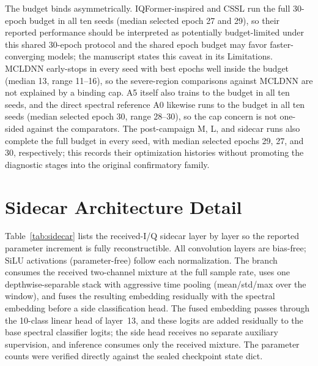 \documentclass[letterpaper,onecolumn,11pt,journal]{IEEEtran}
\begin{document}
The budget binds asymmetrically. IQFormer-inspired and CSSL run the full
30-epoch budget in all ten seeds (median selected epoch 27 and 29), so their
reported performance should be interpreted as potentially budget-limited under
this shared 30-epoch protocol and the shared epoch budget may favor
faster-converging
models; the manuscript states this caveat in its Limitations. MCLDNN
early-stops in every seed with best epochs well inside the budget (median 13,
range 11--16), so the severe-region comparisons against MCLDNN are not
explained by a binding cap. A5 itself also trains to the budget in all ten
seeds, and the direct spectral reference A0 likewise runs to the budget in
all ten seeds (median selected epoch 30, range 28--30), so the cap concern
is not one-sided against the comparators. The post-campaign M, L, and sidecar runs also
complete the full budget in every seed, with median selected epochs 29, 27,
and 30, respectively; this records their optimization histories without
promoting the diagnostic stages into the original confirmatory family.

\section{Sidecar Architecture Detail}
Table~\ref{tab:sidecar} lists the received-I/Q sidecar layer by layer so the
reported parameter increment is fully reconstructible. All convolution layers
are bias-free; SiLU activations (parameter-free) follow each normalization.
The branch consumes the received two-channel mixture at the full sample rate,
uses one depthwise-separable stack with aggressive time pooling
(mean/std/max over the window), and fuses the resulting embedding residually
with the spectral embedding before a side classification head. The fused
embedding passes through the 10-class linear head of layer~13, and these
logits are added residually to the base spectral classifier logits; the side
head receives no separate auxiliary supervision, and inference consumes only
the received mixture. The parameter
counts were verified directly against the sealed checkpoint state dict.
\end{document}
